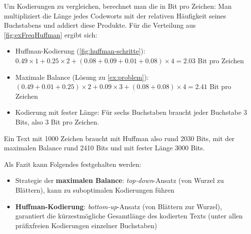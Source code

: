 Um Kodierungen zu vergleichen, berechnet man die  in Bit pro Zeichen: Man multipliziert die Länge jedes Codeworts mit der relativen Häufigkeit seines Buchstabens und addiert diese Produkte. Für die Verteilung aus \cref{fig:exFreqHuffman} ergibt sich:
\begin{itemize}
	\item Huffman-Kodierung (\cref{fig:huffman-schritte}): $0.49\times1 + 0.25\times2 + (0.08+0.09+0.01+0.08)\times4 = 2.03$ Bit pro Zeichen
	\item Maximale Balance (Lösung zu \cref{ex:problem}): $(0.49+0.01+0.25)\times2 + 0.09\times3 + (0.08+0.08)\times4 = 2.41$ Bit pro Zeichen
	\item Kodierung mit fester Länge: Für sechs Buchstaben braucht jeder Buchstabe 3 Bits, also 3 Bit pro Zeichen.
\end{itemize}
Ein Text mit 1000 Zeichen braucht mit Huffman also rund 2030 Bits, mit der maximalen Balance rund 2410 Bits und mit fester Länge 3000 Bits.

Als Fazit kann Folgendes festgehalten werden:
\begin{itemize}
	\item Strategie der \textbf{maximalen Balance}: \textit{top-down}-Ansatz (von Wurzel zu Blättern), kann zu suboptimalen Kodierungen führen
	\item \textbf{Huffman-Kodierung}: \textit{bottom-up}-Ansatz (von Blättern zur Wurzel), garantiert die kürzestmögliche Gesamtlänge des kodierten Texts (unter allen präfixfreien Kodierungen einzelner Buchstaben)
\end{itemize}


